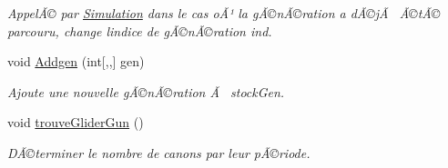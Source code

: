 \begin{DoxyCompactItemize}
\begin{DoxyCompactList}\small\item\em AppelÃ© par \mbox{\hyperlink{class_simulation}{Simulation}} dans le cas oÃ¹ la gÃ©nÃ©ration a dÃ©jÃ  Ã©tÃ© parcouru, change l\textquotesingle{}indice de gÃ©nÃ©ration ind. \end{DoxyCompactList}\item 
void \mbox{\hyperlink{class_detection_a92c60be1a69ea74b7f7bef04a0e53238}{Addgen}} (int\mbox{[},,\mbox{]} gen)
\begin{DoxyCompactList}\small\item\em Ajoute une nouvelle gÃ©nÃ©ration Ã  stock\+Gen. \end{DoxyCompactList}\item 
void \mbox{\hyperlink{class_detection_aa21c434f39d4e9d901635d9db2a4bbca}{trouve\+Glider\+Gun}} ()
\begin{DoxyCompactList}\small\item\em DÃ©terminer le nombre de canons par leur pÃ©riode. \end{DoxyCompactList}\end{DoxyCompactItemize}
